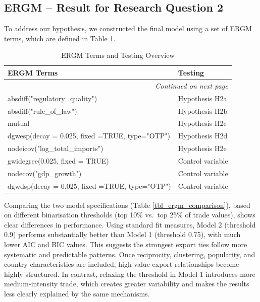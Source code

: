 \documentclass[
]{article}
\begin{document}
\subsection{ERGM -- Result for Research Question
2}\label{ergm-result-for-research-question-2}

To address our hypothesis, we constructed the final model using a set of
ERGM terms, which are defined in Table \ref{tbl_terms_testing}.

\begin{longtable}{p{10cm} p{4cm}}
\caption{ERGM Terms and Testing Overview}
\label{tbl_terms_testing} \\
\toprule
\textbf{ERGM Terms} & \textbf{Testing} \\
\midrule
\endhead

\midrule
\multicolumn{2}{r}{\footnotesize\emph{Continued on next page}} \\
\endfoot

\bottomrule
\endlastfoot

absdiff("regulatory\_quality") & Hypothesis H2a \\
absdiff("rule\_of\_law")  & Hypothesis H2b \\
mutual & Hypothesis H2c \\
dgwesp(decay = 0.025, fixed =TRUE, type="OTP") & Hypothesis H2d \\
nodeicov("log\_total\_imports") & Hypothesis H2e \\
gwidegree(0.025, fixed = TRUE) & Control variable \\
nodecov("gdp\_growth") & Control variable \\
dgwdsp(decay = 0.025, fixed =TRUE, type="OTP") & Control variable \\

\end{longtable}

Comparing the two model specifications (Table
\ref{tbl_ergm_comparison}), based on different binarisation thresholds
(top 10\% vs.~top 25\% of trade values), shows clear differences in
performance. Using standard fit measures, Model 2 (threshold 0.9)
performs substantially better than Model 1 (threshold 0.75), with much
lower AIC and BIC values. This suggests the strongest export ties follow
more systematic and predictable patterns. Once reciprocity, clustering,
popularity, and country characteristics are included, high-value export
relationships become highly structured. In contrast, relaxing the
threshold in Model 1 introduces more medium-intensity trade, which
creates greater variability and makes the results less clearly explained
by the same mechanisms.
\end{document}
